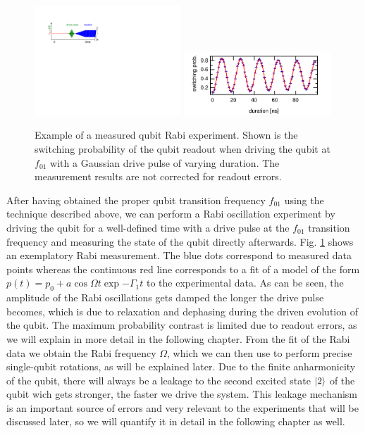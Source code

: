 \begin{figure}[ht!]
\centering
\includegraphics[width=0.49\textwidth]{"./material/figures/measurement/qubit_rabi_oscillation"}
\includegraphics[width=0.49\textwidth]{"./data/ct5/2011_04_21 - grover and tomo/example - qubit 2 rabi"}
\caption[]{Example of a measured qubit Rabi experiment. Shown is the switching probability of the qubit readout when driving the qubit at $f_{01}$ with a Gaussian drive pulse of varying duration. The measurement results are not corrected for readout errors.}
\label{fig:qubit_rabi_example}
\end{figure}

After having obtained the proper qubit transition frequency $f_{01}$ using the technique described above, we can perform a Rabi oscillation experiment by driving the qubit for a well-defined time with a drive pulse at the $f_{01}$ transition frequency and measuring the state of the qubit directly afterwards. Fig. \ref{fig:qubit_rabi_example} shows an exemplatory Rabi measurement. The blue dots correspond to measured data points whereas the continuous red line corresponds to a fit of a model of the form $p(t)=p_0+a\cos{\Omega t}\exp{-\Gamma_1 t}$ to the experimental data. As can be seen, the amplitude of the Rabi oscillations gets damped the longer the drive pulse becomes, which is due to relaxation and dephasing during the driven evolution of the qubit. The maximum probability contrast is limited due to readout errors, as we will explain in more detail in the following chapter. From the fit of the Rabi data we obtain the Rabi frequency $\Omega$, which we can then use to perform precise single-qubit rotations, as will be explained later. Due to the finite anharmonicity of the qubit, there will always be a leakage to the second excited state $\left| 2 \right>$ of the qubit wich gets stronger, the faster we drive the system. This leakage mechanism is an important source of errors and very relevant to the experiments that will be discussed later, so we will quantify it in detail in the following chapter as well.

